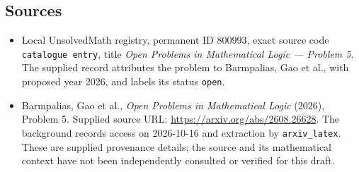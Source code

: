 \documentclass[11pt]{article}
\begin{document}
\subsection{Sources}
\begin{itemize}
\item Local UnsolvedMath registry, permanent ID \(800993\), exact source code \texttt{catalogue entry}, title \emph{Open Problems in Mathematical Logic --- Problem 5}. The supplied record attributes the problem to Barmpalias, Gao et al., with proposed year 2026, and labels its status \texttt{open}.
\item Barmpalias, Gao et al., \emph{Open Problems in Mathematical Logic} (2026), Problem 5. Supplied source URL: \url{https://arxiv.org/abs/2608.26628}. The background records access on 2026-10-16 and extraction by \texttt{arxiv\_latex}. These are supplied provenance details; the source and its mathematical context have not been independently consulted or verified for this draft.
\end{itemize}
\end{document}

